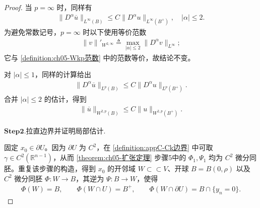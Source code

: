 \documentclass[../../main.tex]{subfiles}%
\begin{document}
\begin{proof}
当 $p=\infty$ 时，同样有
\begin{align*}
\|D^{\alpha}\overline u\|_{L^{\infty}(B)}
\leqslant C\|D^{\alpha}u\|_{L^{\infty}(B^{+})},\quad |\alpha|\leqslant2.
\end{align*}
为避免常数记号，$p=\infty$ 时以下使用等价范数
\begin{align*}
\|v\|'_{W^{2,\infty}}\triangleq\max_{|\alpha|\leqslant2}\|D^{\alpha}v\|_{L^{\infty}};
\end{align*}
它与 \cref{definition:ch05-Wkp范数} 中的范数等价，故结论不变。

对 $|\alpha|\leqslant1$，同样的计算给出
\begin{align*}
\|D^{\alpha}\overline u\|_{L^{p}(B)}
\leqslant C\|D^{\alpha}u\|_{L^{p}(B^{+})}.
\end{align*}
合并 $|\alpha|\leqslant2$ 的估计，得到
\begin{align}
\|\overline u\|_{W^{2,p}(B)}
\leqslant C\|u\|_{W^{2,p}(B^{+})}.
\label{eq:ch05-W2p-local-reflection}
\end{align}

\noindent$\mathbf{Step}\bm{2}$.{\heiti 拉直边界并证明局部估计.}

固定 $x_0\in\partial U$。因为 $\partial U$ 为 $C^{2}$，在 \cref{definition:appC-Ck边界} 中可取 $\gamma\in C^{2}(\mathbb{R}^{n-1})$，从而 \cref{theorem:ch05-扩张定理} 步骤5中的 $\Phi_1,\Psi_1$ 均为 $C^{2}$ 微分同胚。重复该步骤的构造，得到 $x_0$ 的开邻域 $W\subset\subset V$、开球 $B=B(0,\rho)$ 以及 $C^{2}$ 微分同胚 $\Phi:W\to B$，其逆为 $\Psi:B\to W$，使得
\begin{align*}
\Phi(W)=B,\qquad \Phi(W\cap U)=B^{+},\qquad \Phi(W\cap\partial U)=B\cap\{y_n=0\}.
\end{align*}


\end{proof}
\end{document}
